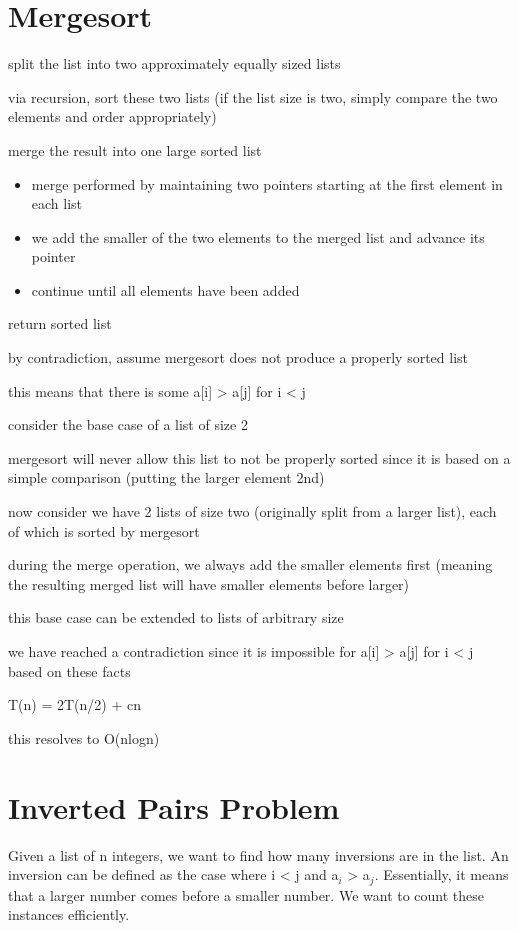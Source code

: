 \section{Mergesort}
\algorithm
{
    \item split the list into two approximately equally sized lists
    \item via recursion, sort these two lists (if the list size is two, simply compare the two elements and order appropriately)
    \item merge the result into one large sorted list
    \begin{itemize}
        \item merge performed by maintaining two pointers starting at the first element in each list
        \item we add the smaller of the two elements to the merged list and advance its pointer
        \item continue until all elements have been added
    \end{itemize}
    \item return sorted list
}
{
    \item by contradiction, assume mergesort does not produce a properly sorted list
    \item this means that there is some a[i] > a[j] for i < j
    \item consider the base case of a list of size 2
    \item mergesort will never allow this list to not be properly sorted since it is based on a simple comparison (putting the larger element 2nd)
    \item now consider we have 2 lists of size two (originally split from a larger list), each of which is sorted by mergesort
    \item during the merge operation, we always add the smaller elements first (meaning the resulting merged list will have smaller elements before larger)
    \item this base case can be extended to lists of arbitrary size
    \item we have reached a contradiction since it is impossible for a[i] > a[j] for i < j based on these facts

}
{
    \item T(n) = 2T(n/2) + cn
    \item this resolves to O(nlogn)
    
}


\section{Inverted Pairs Problem}
Given a list of n integers, we want to find how many inversions are in the list. An inversion can be defined as the case where i < j and a$_i$ > a$_j$. Essentially, it means that a larger number comes before a smaller number. We want to count these instances efficiently. 

